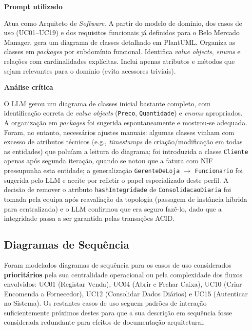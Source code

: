     \begin{tcolorbox}[title=Interação com o LLM]
    \textbf{Prompt utilizado}

    Atua como Arquiteto de \textit{Software}. A partir do modelo de domínio, dos casos de uso (UC01--UC19) e dos requisitos funcionais já definidos para o Belo Mercado Manager, gera um diagrama de classes detalhado em PlantUML. Organiza as classes em \textit{packages} por subdomínio funcional. Identifica \textit{value objects}, \textit{enums} e relações com cardinalidades explícitas. Inclui apenas atributos e métodos que sejam relevantes para o domínio (evita acessores triviais).

    \tcblower

    \textbf{Análise crítica}

    O LLM gerou um diagrama de classes inicial bastante completo, com identificação correta de \textit{value objects} (\texttt{Preco}, \texttt{Quantidade}) e \textit{enums} apropriados. A organização em \textit{packages} foi sugerida espontaneamente e mostrou-se adequada. Foram, no entanto, necessários ajustes manuais: algumas classes vinham com excesso de atributos técnicos (e.g., \textit{timestamps} de criação/modificação em todas as entidades) que poluíam a leitura do diagrama; foi introduzida a classe \texttt{Cliente} apenas após segunda iteração, quando se notou que a fatura com NIF pressupunha esta entidade; a generalização \texttt{GerenteDeLoja} $\rightarrow$ \texttt{Funcionario} foi sugerida pelo LLM e aceite por refletir o papel especializado deste perfil. A decisão de remover o atributo \texttt{hashIntegridade} de \texttt{ConsolidacaoDiaria} foi tomada pela equipa após reavaliação da topologia (passagem de instância híbrida para centralizada) e o LLM confirmou que era seguro fazê-lo, dado que a integridade passa a ser garantida pelas transações ACID.
    \end{tcolorbox}

\subsection{Diagramas de Sequência}
\label{subsec:sequencias}

    Foram modelados diagramas de sequência para os casos de uso considerados \textbf{prioritários} pela sua centralidade operacional ou pela complexidade dos fluxos envolvidos: UC01 (Registar Venda), UC04 (Abrir e Fechar Caixa), UC10 (Criar Encomenda a Fornecedor), UC12 (Consolidar Dados Diários) e UC15 (Autenticar no Sistema). Os restantes casos de uso seguem padrões de interação suficientemente próximos destes para que a sua descrição em sequência fosse considerada redundante para efeitos de documentação arquitetural.

